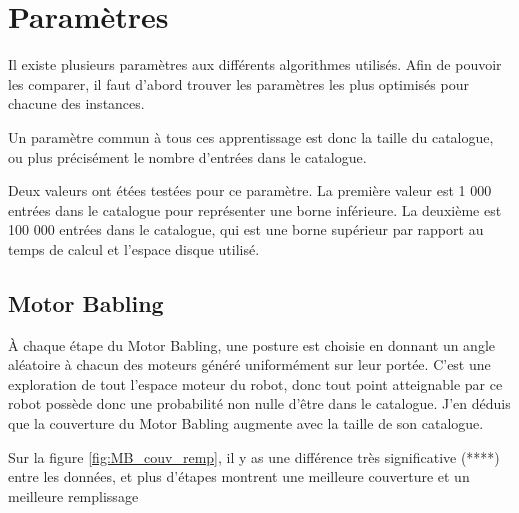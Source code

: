 \documentclass[11pt,french]{report}
\begin{document}
\pagebreak

\section{Paramètres}

Il existe plusieurs paramètres aux différents algorithmes utilisés.
Afin de pouvoir les comparer, il faut d'abord trouver les paramètres les plus optimisés pour chacune des instances.

\phantom{INVISIBLE LINE}

Un paramètre commun à tous ces apprentissage est donc la taille du catalogue, ou plus précisément le nombre d'entrées dans le catalogue.

Deux valeurs ont étées testées pour ce paramètre.
La première valeur est 1 000 entrées dans le catalogue pour représenter une borne inférieure.
La deuxième est 100 000 entrées dans le catalogue, qui est une borne supérieur par rapport au temps de calcul et l'espace disque utilisé.

\subsection{Motor Babling}

\`A chaque étape du Motor Babling, une posture est choisie en donnant un angle aléatoire à chacun des moteurs généré uniformément sur leur portée.
C'est une exploration de tout l'espace moteur du robot, donc tout point atteignable par ce robot possède donc une probabilité non nulle d'être dans le catalogue.
J'en déduis que la couverture du Motor Babling augmente avec la taille de son catalogue.

Sur la figure \ref{fig:MB_couv_remp}, il y as une différence très significative (****) entre les données, et plus d'étapes montrent une meilleure couverture et un meilleure remplissage
\end{document}
